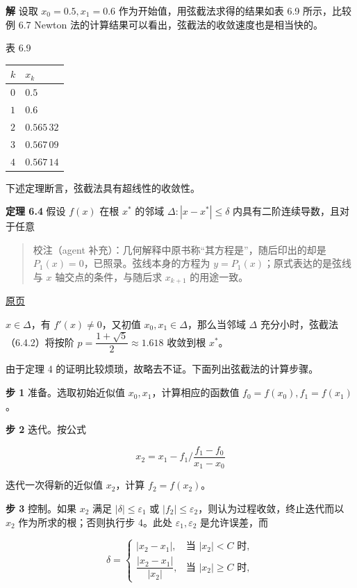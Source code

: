 \documentclass[
  10pt,
  fontset=fandol]{ctexart}
\newcounter{none} %
\begin{document}
\textbf{解} 设取 \(x_0=0.5,x_1=0.6\) 作为开始值，用弦截法求得的结果如表 6.9 所示，比较例 6.7 Newton 法的计算结果可以看出，弦截法的收敛速度也是相当快的。

表 6.9

{\def\LTcaptype{none} %
\begin{longtable}[]{@{}ll@{}}
\toprule\noalign{}
\(k\) & \(x_k\) \\
\midrule\noalign{}
\endhead
\bottomrule\noalign{}
\endlastfoot
\(0\) & \(0.5\) \\
\(1\) & \(0.6\) \\
\(2\) & \(0.565\,32\) \\
\(3\) & \(0.567\,09\) \\
\(4\) & \(0.567\,14\) \\
\end{longtable}
}

下述定理断言，弦截法具有超线性的收敛性。

\textbf{定理 6.4} 假设 \(f(x)\) 在根 \(x^*\) 的邻域 \(\Delta:|x-x^*|\leqslant\delta\) 内具有二阶连续导数，且对于任意

\begin{quote}
校注（agent 补充）：几何解释中原书称``其方程是''，随后印出的却是 \(P_1(x)=0\)，已照录。弦线本身的方程为 \(y=P_1(x)\)；原式表达的是弦线与 \(x\) 轴交点的条件，与随后求 \(x_{k+1}\) 的用途一致。
\end{quote}

\href{../../source-images/pdf-169.jpeg}{原页}

\(x\in\Delta\)，有 \(f'(x)\ne0\)，又初值 \(x_0,x_1\in\Delta\)，那么当邻域 \(\Delta\) 充分小时，弦截法（6.4.2）将按阶 \(p=\dfrac{1+\sqrt{5}}{2}\approx1.618\) 收敛到根 \(x^*\)。

由于定理 4 的证明比较烦琐，故略去不证。下面列出弦截法的计算步骤。

\textbf{步 1} 准备。选取初始近似值 \(x_0,x_1\)，计算相应的函数值 \(f_0=f(x_0),f_1=f(x_1)\)。

\textbf{步 2} 迭代。按公式

\[
x_2=x_1-f_1\bigg/\frac{f_1-f_0}{x_1-x_0}
\]

迭代一次得新的近似值 \(x_2\)，计算 \(f_2=f(x_2)\)。

\textbf{步 3} 控制。如果 \(x_2\) 满足 \(|\delta|\leqslant\varepsilon_1\) 或 \(|f_2|\leqslant\varepsilon_2\)，则认为过程收敛，终止迭代而以 \(x_2\) 作为所求的根；否则执行步 4。此处 \(\varepsilon_1,\varepsilon_2\) 是允许误差，而

\[
\delta=\begin{cases}
|x_2-x_1|,&\text{当 }|x_2|<C\text{ 时},\\
\dfrac{|x_2-x_1|}{|x_2|},&\text{当 }|x_2|\geqslant C\text{ 时},
\end{cases}
\]
\end{document}
